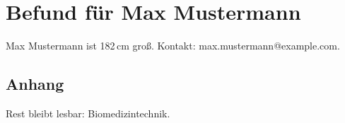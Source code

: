 \documentclass[a4paper,11pt]{article}
\begin{document}
\section{Befund für Max Mustermann}
Max Mustermann ist 182\,cm groß. Kontakt: max.mustermann@example.com.
\subsection{Anhang}
Rest bleibt lesbar: Biomedizintechnik.
\end{document}
